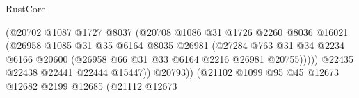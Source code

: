 \begin{lexlean}{RustCore}
\begin{coremodule}
                                            (@20702
                                              @1087
                                              @1727
                                              @8037
                                              (@20708
                                                @1086
                                                @31
                                                @1726
                                                @2260
                                                @8036
                                                @16021
                                                (@26958
                                                  @1085
                                                  @31
                                                  @35
                                                  @6164
                                                  @8035
                                                  @26981
                                                  (@27284
                                                    @763
                                                    @31
                                                    @34
                                                    @2234
                                                    @6166
                                                    @20600
                                                    (@26958
                                                      @66
                                                      @31
                                                      @33
                                                      @6164
                                                      @2216
                                                      @26981
                                                      @20755)))))
                                            @22435
                                            @22438
                                            @22441
                                            @22444
                                            @15447))
                                        @20793))
                                    (@21102
                                      @1099
                                      @95
                                      @45
                                      @12673
                                      @12682
                                      @2199
                                      @12685
                                      (@21112
                                        @12673

\end{coremodule}
\end{lexlean}
